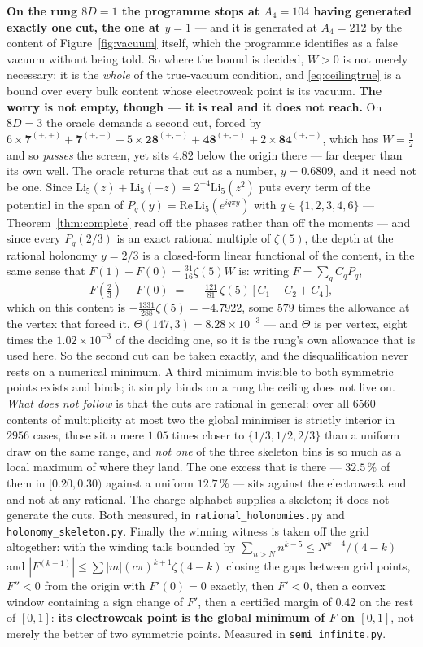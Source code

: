 \documentclass[11pt,a4paper]{article}
\newcommand{\rep}[1]{\mathbf{#1}}
\begin{document}
\textbf{On the rung $8D=1$ the programme stops at $A_4=104$ having generated exactly one cut, the
one at $y=1$} --- and it is generated at $A_4=212$ by the content of Figure~\ref{fig:vacuum}
itself, which the programme identifies as a false vacuum without being told. So where the bound is
decided, $W>0$ is not merely necessary: it is the
\emph{whole} of the true-vacuum condition, and \eqref{eq:ceilingtrue} is a bound over every bulk
content whose electroweak point is its vacuum. \textbf{The worry is not empty, though --- it is
real and it does not reach.} On $8D=3$ the oracle demands a second cut, forced by
$6\times\rep7^{(+,+)}+\rep7^{(+,-)}+5\times\rep{28}^{(+,-)}+\rep{48}^{(+,-)}+2\times\rep{84}^{(+,+)}$,
which has $W=\tfrac12$ and so \emph{passes} the screen, yet sits $4.82$ below the origin there ---
far deeper than its own well. The oracle returns that cut as a number, $y=0.6809$, and it need not
be one. Since $\mathrm{Li}_5(z)+\mathrm{Li}_5(-z)=2^{-4}\mathrm{Li}_5(z^{2})$ puts every term of the
potential in the span of $P_q(y)=\mathrm{Re}\,\mathrm{Li}_5(e^{iq\pi y})$ with $q\in\{1,2,3,4,6\}$
--- Theorem~\ref{thm:complete} read off the phases rather than off the moments --- and since every
$P_q(2/3)$ is an exact rational multiple of $\zeta(5)$, the depth at the rational holonomy $y=2/3$
is a closed-form linear functional of the content, in the same sense that $F(1)-F(0)=\tfrac{31}{16}
\zeta(5)W$ is: writing $F=\sum_qC_qP_q$,
\[
  F(\tfrac23)-F(0)\;=\;-\tfrac{121}{81}\,\zeta(5)\,\bigl[\,C_1+C_2+C_4\,\bigr],
\]
which on this content is $-\tfrac{1331}{288}\zeta(5)=-4.7922$, some $579$ times the allowance at
the vertex that forced it, $\Theta(147,3)=8.28\times10^{-3}$ --- and $\Theta$ is per vertex, eight
times the $1.02\times10^{-3}$ of the deciding one, so it is the rung's own allowance that is used
here. So the second cut can be taken exactly, and the disqualification never rests
on a numerical minimum. A third minimum invisible to both symmetric points exists and binds; it
simply binds on a rung the ceiling does not live on. \emph{What does not follow} is that the cuts
are rational in general: over all $6560$ contents of multiplicity at most two the global minimiser
is strictly interior in $2956$ cases, those sit a mere $1.05$ times closer to $\{1/3,1/2,2/3\}$ than
a uniform draw on the same range, and \emph{not one} of the three skeleton bins is so much as a
local maximum of where they land. The one excess that is there --- $32.5\,\%$ of them in
$[0.20,0.30)$ against a uniform $12.7\,\%$ --- sits against the electroweak end and not at any
rational. The charge alphabet supplies a skeleton; it does not generate the cuts. Both measured, in
\texttt{rational\_\allowbreak holonomies.py} and \texttt{holonomy\_\allowbreak skeleton.py}.
Finally the winning witness is
taken off the grid altogether: with the winding tails bounded by
$\sum_{n>N}n^{k-5}\le N^{k-4}/(4-k)$ and $|F^{(k+1)}|\le\sum|m|(c\pi)^{k+1}\zeta(4-k)$ closing the
gaps between grid points, $F''<0$ from the origin with $F'(0)=0$ exactly, then $F'<0$, then a
convex window containing a sign change of $F'$, then a certified margin of $0.42$ on the rest of
$[0,1]$: \textbf{its electroweak point is the global minimum of $F$ on $[0,1]$}, not merely the
better of two symmetric points. Measured in \texttt{semi\_\allowbreak infinite.py}.
\end{document}
